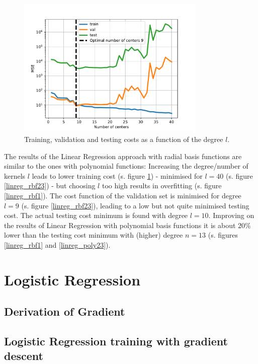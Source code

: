 \documentclass{article}
\begin{document}
\begin{figure}[!ht]
\centering
\includegraphics[width=0.8\textwidth]{./Figures/linreg_rbf4_errors.pdf}
\caption{Training, validation and testing costs as a function of the degree $l$.}
\label{linreg_rbf4}
\end{figure}

The results of the Linear Regression approach with radial basis functions are similar to the ones with polynomial functions: Increasing the degree/number of kernels $l$ leads to lower training cost (s. figure \ref{linreg_rbf4}) - minimised for $l=40$ (s. figure \ref{linreg_rbf23}) - but choosing $l$ too high results in overfitting (s. figure \ref{linreg_rbf1}). The cost function of the validation set is minimised for degree $l=9$ (s. figure \ref{linreg_rbf23}), leading to a low but not quite minimised testing cost. The actual testing cost minimum is found with degree $l=10$. Improving on the results of Linear Regression with polynomial basis functions it is about $20\%$ lower than the testing cost minimum with (higher) degree $n=13$ (s. figures \ref{linreg_rbf1} and \ref{linreg_poly23}). 


\clearpage

\section{Logistic Regression}
\subsection{Derivation of Gradient}

\newpage

\subsection{Logistic Regression training with gradient descent}
\end{document}
